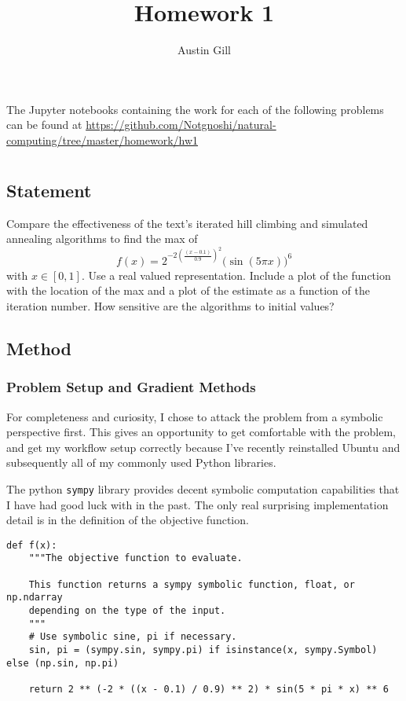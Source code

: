 \documentclass{article}
\title{Homework 1}
\author{Austin Gill}
\begin{document}
\maketitle

The Jupyter notebooks containing the work for each of the following problems can be found at
\url{https://github.com/Notgnoshi/natural-computing/tree/master/homework/hw1}

\section{}\label{prob:1}

\subsection{Statement}
Compare the effectiveness of the text's iterated hill climbing and simulated annealing algorithms
to find the max of
\[ f(x) = 2^{-2{\left(\frac{(x - 0.1)}{0.9}\right)}^2}{\big(\sin(5\pi x)\big)}^6\]
with $x\in [0,1]$. Use a real valued representation. Include a plot of the function with the
location of the max and a plot of the estimate as a function of the iteration number. How sensitive
are the algorithms to initial values?

\subsection{Method}

\subsubsection{Problem Setup and Gradient Methods}

For completeness and curiosity, I chose to attack the problem from a symbolic perspective first.
This gives an opportunity to get comfortable with the problem, and get my workflow setup correctly
because I've recently reinstalled Ubuntu and subsequently all of my commonly used Python libraries.

The python \texttt{sympy} library provides decent symbolic computation capabilities
that I have had good luck with in the past. The only real surprising implementation detail is in
the definition of the objective function.

\begin{verbatim}
def f(x):
    """The objective function to evaluate.

    This function returns a sympy symbolic function, float, or np.ndarray
    depending on the type of the input.
    """
    # Use symbolic sine, pi if necessary.
    sin, pi = (sympy.sin, sympy.pi) if isinstance(x, sympy.Symbol) else (np.sin, np.pi)

    return 2 ** (-2 * ((x - 0.1) / 0.9) ** 2) * sin(5 * pi * x) ** 6
\end{verbatim}
\end{document}
